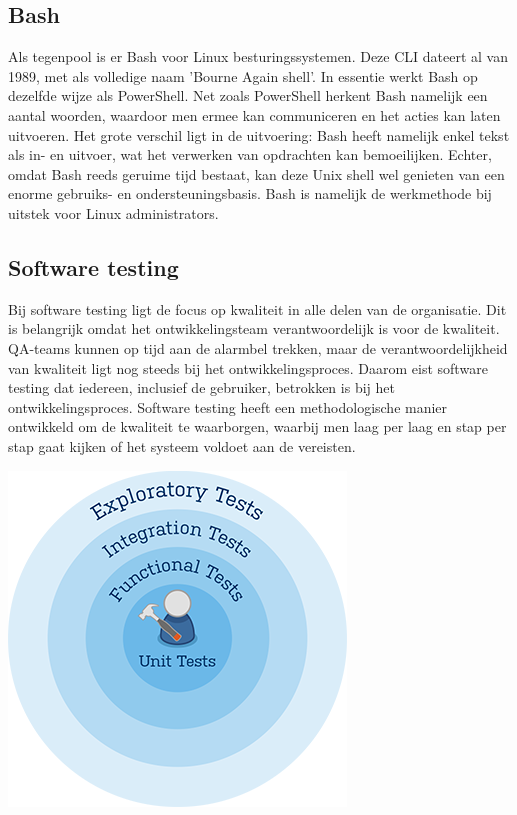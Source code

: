 \subsection{Bash}
Als tegenpool is er Bash voor Linux besturingssystemen. Deze CLI dateert al van 1989, met als volledige naam 'Bourne Again shell'. In essentie werkt Bash op dezelfde wijze als PowerShell. Net zoals PowerShell herkent Bash namelijk een aantal woorden, waardoor men ermee kan communiceren en het acties kan laten uitvoeren. Het grote verschil ligt in de uitvoering: Bash heeft namelijk enkel tekst als in- en uitvoer, wat het verwerken van opdrachten kan bemoeilijken. Echter, omdat Bash reeds geruime tijd bestaat, kan deze Unix shell wel genieten van een enorme gebruiks- en ondersteuningsbasis. Bash is namelijk de werkmethode bij uitstek voor Linux administrators.


\subsection{Software testing}
\label{sec:testing-uitleg}
Bij software testing ligt de focus op kwaliteit in alle delen van de organisatie. Dit is belangrijk omdat het ontwikkelingsteam verantwoordelijk is voor de kwaliteit. QA-teams kunnen op tijd aan de alarmbel trekken, maar de verantwoordelijkheid van kwaliteit ligt nog steeds bij het ontwikkelingsproces. Daarom eist software testing dat iedereen, inclusief de gebruiker, betrokken is bij het ontwikkelingsproces. Software testing heeft een methodologische manier ontwikkeld om de kwaliteit te waarborgen, waarbij men laag per laag en stap per stap gaat kijken of het systeem voldoet aan de vereisten.

\begin{center}
	\includegraphics[scale=0.5]{img/testing.png}
\end{center}

